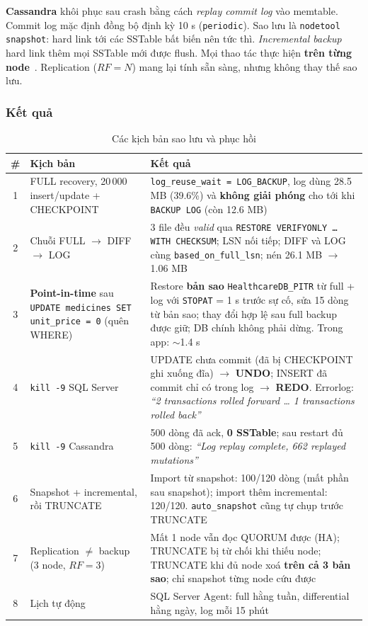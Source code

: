 \textbf{Cassandra} khôi phục sau crash bằng cách \textit{replay commit log} vào memtable. Commit log mặc định đồng bộ định kỳ 10 s (\texttt{periodic}). Sao lưu là \texttt{nodetool snapshot}: hard link tới các SSTable bất biến nên tức thì. \textit{Incremental backup} hard link thêm mọi SSTable mới được flush. Mọi thao tác thực hiện \textbf{trên từng node}~\cite{cassandra-docs}. Replication ($RF = N$) mang lại tính sẵn sàng, nhưng không thay thế sao lưu.

\subsubsection{Kết quả}

\begin{table}[H]
\centering
\caption{Các kịch bản sao lưu và phục hồi}
\label{tab:backup}
\small
\begin{tabularx}{\linewidth}{|c|p{3.6cm}|X|}
\hline
\textbf{\#} & \textbf{Kịch bản} & \textbf{Kết quả} \\ \hline
1 & FULL recovery, 20\,000 insert/update + CHECKPOINT & \texttt{log\_reuse\_wait = LOG\_BACKUP}, log dùng 28.5 MB (39.6\%) và \textbf{không giải phóng} cho tới khi \texttt{BACKUP LOG} (còn 12.6 MB) \\ \hline
2 & Chuỗi FULL $\rightarrow$ DIFF $\rightarrow$ LOG & 3 file đều \textit{valid} qua \texttt{RESTORE VERIFYONLY \ldots{} WITH CHECKSUM}; LSN nối tiếp; DIFF và LOG cùng \texttt{based\_on\_full\_lsn}; nén 26.1 MB $\rightarrow$ 1.06 MB \\ \hline
3 & \textbf{Point-in-time} sau \texttt{UPDATE medicines SET unit\_price = 0} (quên WHERE) & Restore \textbf{bản sao} \texttt{HealthcareDB\_PITR} từ full + log với \texttt{STOPAT} = 1 s trước sự cố, sửa 15 dòng từ bản sao; thay đổi hợp lệ sau full backup được giữ; DB chính không phải dừng. Trong app: $\sim$1.4 s \\ \hline
4 & \texttt{kill -9} SQL Server & UPDATE chưa commit (đã bị CHECKPOINT ghi xuống đĩa) $\rightarrow$ \textbf{UNDO}; INSERT đã commit chỉ có trong log $\rightarrow$ \textbf{REDO}. Errorlog: \textit{``2 transactions rolled forward \ldots{} 1 transactions rolled back''} \\ \hline
5 & \texttt{kill -9} Cassandra & 500 dòng đã ack, \textbf{0 SSTable}; sau restart đủ 500 dòng: \textit{``Log replay complete, 662 replayed mutations''} \\ \hline
6 & Snapshot + incremental, rồi TRUNCATE & Import từ snapshot: 100/120 dòng (mất phần sau snapshot); import thêm incremental: 120/120. \texttt{auto\_snapshot} cũng tự chụp trước TRUNCATE \\ \hline
7 & Replication $\neq$ backup (3 node, $RF = 3$) & Mất 1 node vẫn đọc QUORUM được (HA); TRUNCATE bị từ chối khi thiếu node; TRUNCATE khi đủ node xoá \textbf{trên cả 3 bản sao}; chỉ snapshot từng node cứu được \\ \hline
8 & Lịch tự động & SQL Server Agent: full hằng tuần, differential hằng ngày, log mỗi 15 phút \\ \hline
\end{tabularx}
\end{table}

